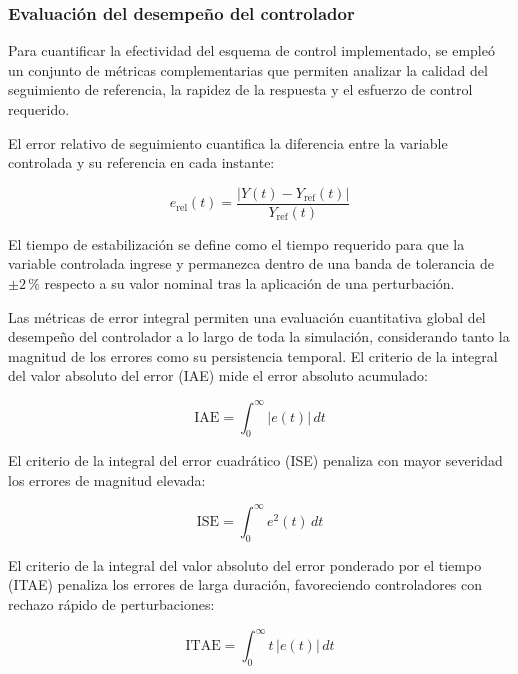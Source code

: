 \subsubsection{Evaluación del desempeño del controlador}
\label{sec:criterios}

Para cuantificar la efectividad del esquema de control implementado, se empleó un
conjunto de métricas complementarias que permiten analizar la calidad del seguimiento de
referencia, la rapidez de la respuesta y el esfuerzo de control requerido.

El error relativo de seguimiento cuantifica la diferencia entre la variable
controlada y su referencia en cada instante:

\begin{equation}
    e_{\mathrm{rel}}(t) = \frac{\left|Y(t) - Y_{\mathrm{ref}}(t)\right|}{Y_{\mathrm{ref}}(t)}
    \label{eq:ErrorRelativo}
\end{equation}

El tiempo de estabilización se define como el tiempo requerido para que la
variable controlada ingrese y permanezca dentro de una banda de tolerancia de $\pm 2\,\%$
respecto a su valor nominal tras la aplicación de una perturbación.

Las métricas de error integral permiten una evaluación cuantitativa global del
desempeño del controlador a lo largo de toda la simulación, considerando tanto la
magnitud de los errores como su persistencia temporal. El criterio
de la integral del valor absoluto del error (IAE) mide el error absoluto acumulado:

\begin{equation}
    \mathrm{IAE} = \int_0^{\infty} |e(t)|\, dt
    \label{eq:IAE}
\end{equation}

El criterio de la integral del error cuadrático (ISE) penaliza con mayor severidad los
errores de magnitud elevada:

\begin{equation}
    \mathrm{ISE} = \int_0^{\infty} e^2(t)\, dt
    \label{eq:ISE}
\end{equation}

El criterio de la integral del valor absoluto del error ponderado por el tiempo (ITAE)
penaliza los errores de larga duración, favoreciendo controladores con rechazo rápido de
perturbaciones:

\begin{equation}
    \mathrm{ITAE} = \int_0^{\infty} t\,|e(t)|\, dt
    \label{eq:ITAE}
\end{equation}

